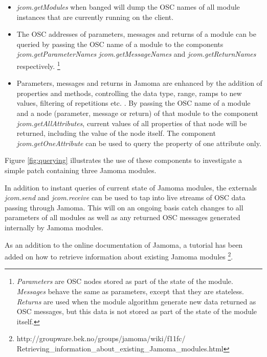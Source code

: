\documentclass{article}
\begin{document}
\begin{itemize}
	
	\item \emph{jcom.getModules} when banged will dump the OSC names of all module instances that are currently running on the client.

	\item The OSC addresses of parameters, messages and returns of a module can be queried by passing the OSC name of a module to the components \emph{jcom.getParameterNames} \emph{jcom.getMessageNames} and \emph{jcom.getReturnNames} respectively. \footnote{\emph{Parameters} are OSC nodes stored as part of the state of the module. \emph{Messages} behave the same as parameters, except that they are stateless. \emph{Returns} are used when the module algorithm generate new data returned as OSC messages, but this data is not stored as part of the state of the module itself.}

	\item Parameters, messages and returns in Jamoma are enhanced by the addition of properties and methods, controlling the data type, range, ramps to new values, filtering of repetitions etc. \cite{Place:2006jamoma, Place:2008osc_properties, Place_2008_flexible_control}. By passing the OSC name of a module and a node (parameter, message or return) of that module to the component \emph{jcom.getAllAttributes}, current values of all properties of that node will be returned, including the value of the node itself. The component \emph{jcom.getOneAttribute} can be used to query the property of one attribute only.
		
\end{itemize}

Figure \ref{fig:querying} illustrates the use of these components to investigate a simple patch containing three Jamoma modules.

In addition to instant queries of current state of Jamoma modules, the externals \emph{jcom.send} and \emph{jcom.receive} can be used to tap into live streams of OSC data passing through Jamoma. This will on an ongoing basis catch changes to all parameters of all modules as well as any returned OSC messages generated internally by Jamoma modules.

As an addition to the online documentation of Jamoma, a tutorial has been added on how to retrieve information about existing Jamoma modules \footnote{http://groupware.bek.no/groups/jamoma/wiki/f11fc/ \\ Retrieving\_information\_about\_existing\_Jamoma\_modules.html}.
\end{document}
